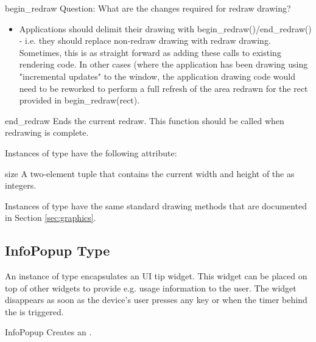 \begin{methoddesc}[Canvas]{begin_redraw}{}
Question: What are the changes required for redraw drawing?
\begin{itemize}
\item Applications should delimit their drawing with begin_redraw()/end_redraw() 
- i.e. they should replace non-redraw drawing with redraw drawing. Sometimes, 
this is as straight forward as adding these calls to existing rendering code.
In other cases (where the application has been drawing using "incremental updates" 
to the window, the application drawing code would need to be reworked to perform a 
full refresh of the area redrawn for the rect provided in begin_redraw(rect).
\end{itemize}
\end{methoddesc}

\begin{methoddesc}[Canvas]{end_redraw}{}
Ends the current redraw. This function should be called when redrawing is complete.
\end{methoddesc}


Instances of  type have the following attribute:

\begin{memberdesc}[Canvas]{size}
A two-element tuple that contains the current width and height of the 
 as integers.
\end{memberdesc}

Instances of  type have the same standard drawing methods 
that are documented in Section \ref{sec:graphics}.

\subsection{InfoPopup Type}
\label{subsec:infopopup}

An instance of  type encapsulates an UI tip widget. This widget 
can be placed on top of other widgets to provide e.g. usage information to the 
user. The widget disappears as soon as the device's user presses any key or when 
the timer behind the  is triggered.

\begin{classdesc}{InfoPopup}{}
Creates an .
\end{classdesc}

